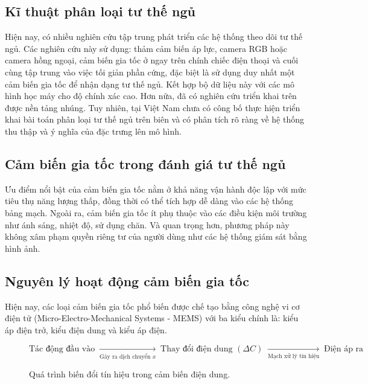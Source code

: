 \subsection{Kĩ thuật phân loại tư thế ngủ}

Hiện nay, có nhiều nghiên cứu tập trung phát triển các hệ thống theo dõi tư thế
ngủ. Các nghiên cứu này sử dụng: thảm cảm biến áp lực, camera RGB hoặc camera
hồng ngoại, cảm biến gia tốc ở ngay trên chính chiếc điện thoại và cuối cùng
tập trung vào việc tối giản phần cứng, đặc biệt là sử dụng duy nhất một cảm
biến gia tốc để nhận dạng tư thế ngủ. Kết hợp bộ dữ liệu này với các mô hình
học máy cho độ chính xác cao. Hơn nữa, đã có nghiên cứu triển khai trên được
nền tảng nhúng. Tuy nhiên, tại Việt Nam chưa có công bố thực hiện triển khai
bài toán phân loại tư thế ngủ trên biên và có phân tích rõ ràng về hệ thống thu
thập và ý nghĩa của đặc trưng lên mô hình.

\subsection{Cảm biến gia tốc trong đánh giá tư thế ngủ}

Ưu điểm nổi bật của cảm biến gia tốc nằm ở khả năng vận hành độc lập với mức
tiêu thụ năng lượng thấp, đồng thời có thể tích hợp dễ dàng vào các hệ thống
bảng mạch.
Ngoài ra, cảm
biến gia tốc ít phụ thuộc vào các điều kiện môi trường như ánh sáng, nhiệt độ,
sử dụng chăn. Và quan trọng hơn, phương pháp này không xâm phạm quyền riêng tư
của người dùng như các hệ thống giám sát bằng hình ảnh.

\subsection*{Nguyên lý hoạt động cảm biến gia tốc}

Hiện nay, các loại cảm biến gia tốc phổ biến được chế tạo bằng công nghệ vi cơ
điện tử (Micro-Electro-Mechanical Systems - MEMS) với ba kiểu chính là: kiểu áp
điện trở, kiểu điện dung và kiểu áp điện.

\begin{figure}[H]
      \centering
      \[
            \text{Tác động đầu vào}
            \;\xrightarrow[\text{Gây ra dịch chuyển }x]{}
            \;
            \text{Thay đổi điện dung }(\Delta C)
            \;\xrightarrow[\text{Mạch xử lý tín hiệu}]{}
            \;
            \text{Điện áp ra}
      \]
      \caption{Quá trình biến đổi tín hiệu trong cảm biến điện dung.}
      \label{fig:signal_flow}
\end{figure}

